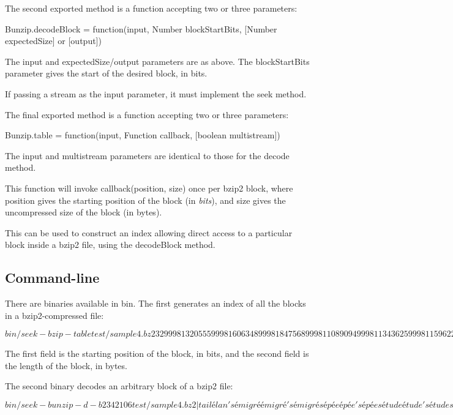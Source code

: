 The second exported method is a function accepting two or three parameters\+:

{\ttfamily Bunzip.\+decode\+Block = function(input, Number block\+Start\+Bits, \mbox{[}\+Number expected\+Size\mbox{]} or \mbox{[}output\mbox{]})}

The {\ttfamily input} and {\ttfamily expected\+Size}/{\ttfamily output} parameters are as above. The {\ttfamily block\+Start\+Bits} parameter gives the start of the desired block, in bits.

If passing a stream as the {\ttfamily input} parameter, it must implement the {\ttfamily seek} method.

The final exported method is a function accepting two or three parameters\+:

{\ttfamily Bunzip.\+table = function(input, Function callback, \mbox{[}boolean multistream\mbox{]})}

The {\ttfamily input} and {\ttfamily multistream} parameters are identical to those for the {\ttfamily decode} method.

This function will invoke {\ttfamily callback(position, size)} once per bzip2 block, where {\ttfamily position} gives the starting position of the block (in {\itshape bits}), and {\ttfamily size} gives the uncompressed size of the block (in bytes).

This can be used to construct an index allowing direct access to a particular block inside a bzip2 file, using the {\ttfamily decode\+Block} method.

\subsection*{Command-\/line}

There are binaries available in bin. The first generates an index of all the blocks in a bzip2-\/compressed file\+: 
\begin{DoxyCode}
$ bin/seek-bzip-table test/sample4.bz2
32  99981
320555  99981
606348  99981
847568  99981
1089094 99981
1343625 99981
1596228 99981
1843336 99981
2090919 99981
2342106 39019
$
\end{DoxyCode}
 The first field is the starting position of the block, in bits, and the second field is the length of the block, in bytes.

The second binary decodes an arbitrary block of a bzip2 file\+: 
\begin{DoxyCode}
$ bin/seek-bunzip -d -b 2342106 test/sample4.bz2 | tail
élan's
émigré
émigré's
émigrés
épée
épée's
épées
étude
étude's
études
$
\end{DoxyCode}


